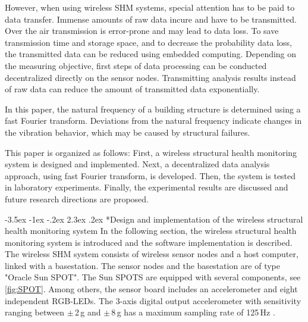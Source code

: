 \documentclass[12pt,a4paper]{scrartcl}
\makeatletter
\renewcommand\section{\@startsection{section}{1}{\z@}%
                     {-3.5ex \@plus -1ex \@minus -.2ex}%
                     {2.3ex \@plus.2ex}%
                     {\normalfont\large\bfseries}}
\makeatother
\begin{document}
However, when using wireless SHM systems, special attention has to be paid to data transfer.
Immense amounts of raw data incure and have to be transmitted.
Over the air transmission is error-prone and may lead to data loss.
To save transmission time and storage space, and to decrease the probability data loss, the transmitted data can be reduced using embedded computing.
Depending on the measuring objective, first steps of data processing can be conducted decentralized directly on the sensor nodes.
Transmitting analysis results instead of raw data can reduce the amount of transmitted data exponentially.

In this paper, the natural frequency of a building structure is determined using a fast Fourier transform.
Deviations from the natural frequency indicate changes in the vibration behavior, which may be caused by structural failures.


This paper is organized as follows:
First, a wireless structural health monitoring system is designed and implemented. 
Next, a decentralized data analysis approach, using fast Fourier transform, is developed.
Then, the system is tested in laboratory experiments.
Finally, the experimental results are discussed and future research directions are proposed.


\section*{Design and implementation of the wireless structural health monitoring system}
In the following section, the wireless structural health monitoring system is introduced and the software implementation is described.
The wireless SHM system consists of wireless sensor nodes and a host computer, linked with a basestation.
The sensor nodes and the basestation are of type "Oracle Sun SPOT". 
The Sun SPOTS are equipped with several components, see \autoref{fig:SPOT}.
Among others, the sensor board includes an accelerometer and eight independent RGB-LEDs.
The 3-axis digital output accelerometer with sensitivity ranging between $\pm$\,2\,g and $\pm$\,8\,g has a maximum sampling rate of 125\,Hz \citep{eDemo2010}.
\end{document}
